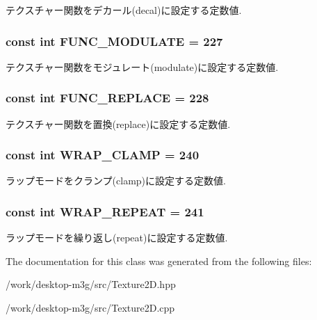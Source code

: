 テクスチャー関数をデカール(decal)に設定する定数値. \hypertarget{classm3g_1_1Texture2D_4482b0d4d6d1f64aaf33c3c5862de30e}{
\subsubsection[{FUNC\_\-MODULATE}]{\setlength{\rightskip}{0pt plus 5cm}const int {\bf FUNC\_\-MODULATE} = 227}}
\label{classm3g_1_1Texture2D_4482b0d4d6d1f64aaf33c3c5862de30e}


テクスチャー関数をモジュレート(modulate)に設定する定数値. \hypertarget{classm3g_1_1Texture2D_14f24332e168c5e210ddad47fb5cdd17}{
\subsubsection[{FUNC\_\-REPLACE}]{\setlength{\rightskip}{0pt plus 5cm}const int {\bf FUNC\_\-REPLACE} = 228}}
\label{classm3g_1_1Texture2D_14f24332e168c5e210ddad47fb5cdd17}


テクスチャー関数を置換(replace)に設定する定数値. \hypertarget{classm3g_1_1Texture2D_e36d8facf5b60eb6c59888121731c438}{
\subsubsection[{WRAP\_\-CLAMP}]{\setlength{\rightskip}{0pt plus 5cm}const int {\bf WRAP\_\-CLAMP} = 240}}
\label{classm3g_1_1Texture2D_e36d8facf5b60eb6c59888121731c438}


ラップモードをクランプ(clamp)に設定する定数値. \hypertarget{classm3g_1_1Texture2D_b37ff061b9fb272284c4c389deec9266}{
\subsubsection[{WRAP\_\-REPEAT}]{\setlength{\rightskip}{0pt plus 5cm}const int {\bf WRAP\_\-REPEAT} = 241}}
\label{classm3g_1_1Texture2D_b37ff061b9fb272284c4c389deec9266}


ラップモードを繰り返し(repeat)に設定する定数値. 

The documentation for this class was generated from the following files:\begin{CompactItemize}
\item 
/work/desktop-m3g/src/Texture2D.hpp\item 
/work/desktop-m3g/src/Texture2D.cpp\end{CompactItemize}
